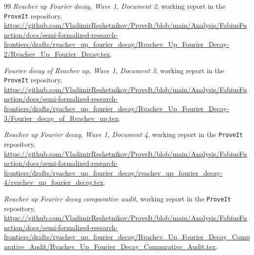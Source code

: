 \documentclass[11pt,oneside]{article}
\theoremstyle{definition}
\theoremstyle{remark}
\begin{document}
\begin{thebibliography}{99}
\emph{Rvachev up Fourier decay, Wave 1, Document 2}, working report in the
\texttt{ProveIt} repository,
\url{https://github.com/VladimirReshetnikov/ProveIt/blob/main/Analysis/FabiusFunction/docs/semi-formalized-research-frontiers/drafts/rvachev_up_fourier_decay/Rvachev_Up_Fourier_Decay-2/Rvachev_Up_Fourier_Decay.tex}.

\emph{Fourier decay of Rvachev up, Wave 1, Document 3}, working report in the
\texttt{ProveIt} repository,
\url{https://github.com/VladimirReshetnikov/ProveIt/blob/main/Analysis/FabiusFunction/docs/semi-formalized-research-frontiers/drafts/rvachev_up_fourier_decay/Rvachev_Up_Fourier_Decay-3/Fourier_decay_of_Rvachev_up.tex}.

\emph{Rvachev up Fourier decay, Wave 1, Document 4}, working report in the
\texttt{ProveIt} repository,
\url{https://github.com/VladimirReshetnikov/ProveIt/blob/main/Analysis/FabiusFunction/docs/semi-formalized-research-frontiers/drafts/rvachev_up_fourier_decay/rvachev_up_fourier_decay-4/rvachev_up_fourier_decay.tex}.

\emph{Rvachev up Fourier decay comparative audit}, working report in the
\texttt{ProveIt} repository,
\url{https://github.com/VladimirReshetnikov/ProveIt/blob/main/Analysis/FabiusFunction/docs/semi-formalized-research-frontiers/drafts/rvachev_up_fourier_decay/Rvachev_Up_Fourier_Decay_Comparative_Audit/Rvachev_Up_Fourier_Decay_Comparative_Audit.tex}.

\end{thebibliography}
\end{document}
